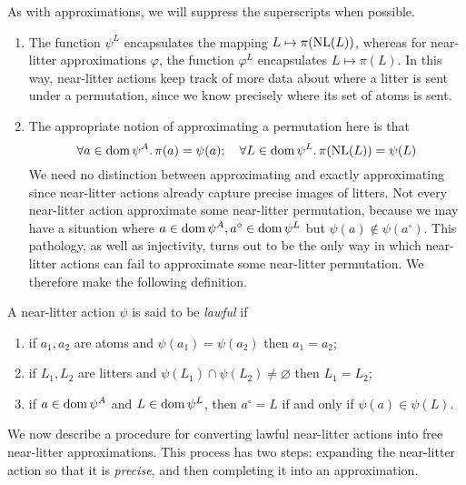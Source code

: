As with approximations, we will suppress the superscripts when possible.

\begin{remarks}\mbox{\negthinspace}
    \begin{enumerate}
        \item The function \( \psi^L \) encapsulates the mapping \( L \mapsto \pi(\operatorname{NL}(L)) \), whereas for near-litter approximations \( \varphi \), the function \( \varphi^L \) encapsulates \( L \mapsto \pi(L) \).
        In this way, near-litter actions keep track of more data about where a litter is sent under a permutation, since we know precisely where its set of atoms is sent.
        \item The appropriate notion of approximating a permutation here is that
        \[ \forall a \in \operatorname{dom} \psi^A.\, \pi(a) = \psi(a);\quad \forall L \in \operatorname{dom} \psi^L.\, \pi(\operatorname{NL}(L)) = \psi(L) \]
        We need no distinction between approximating and exactly approximating since near-litter actions already capture precise images of litters.
        Not every near-litter action approximate some near-litter permutation, because we may have a situation where \( a \in \operatorname{dom} \psi^A, a^\circ \in \operatorname{dom} \psi^L \) but \( \psi(a) \notin \psi(a^\circ) \).
        This pathology, as well as injectivity, turns out to be the only way in which near-litter actions can fail to approximate some near-litter permutation.
        We therefore make the following definition.
    \end{enumerate}
\end{remarks}

\begin{definition}
    A near-litter action \( \psi \) is said to be \emph{lawful} if
    \begin{enumerate}
        \item if \( a_1, a_2 \) are atoms and \( \psi(a_1) = \psi(a_2) \) then \( a_1 = a_2 \);
        \item if \( L_1, L_2 \) are litters and \( \psi(L_1) \cap \psi(L_2) \neq \varnothing \) then \( L_1 = L_2 \);
        \item if \( a \in \operatorname{dom} \psi^A \) and \( L \in \operatorname{dom} \psi^L \), then \( a^\circ = L \) if and only if \( \psi(a) \in \psi(L) \).
    \end{enumerate}
\end{definition}

We now describe a procedure for converting lawful near-litter actions into free near-litter approximations.
This process has two steps: expanding the near-litter action so that it is \emph{precise}, and then completing it into an approximation.

